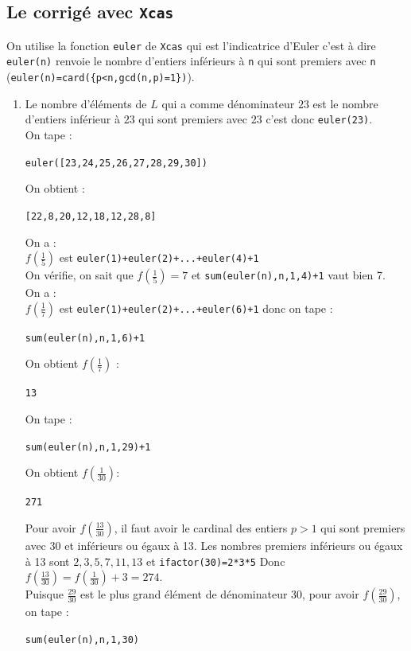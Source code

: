 \documentclass[a4paper,11pt]{book}
\begin{document}
\subsection{Le corrig\'e avec {\tt Xcas}}
On utilise la fonction {\tt euler} de {\tt Xcas} qui est l'indicatrice d'Euler 
c'est \`a dire {\tt euler(n)} renvoie le nombre d'entiers inf\'erieurs \`a 
{\tt n} qui sont premiers avec {\tt n} 
({\tt euler(n)=card(\{p<n,gcd(n,p)=1\})}).
\begin{enumerate}
\item Le nombre d'\'el\'ements de $L$ qui a comme d\'enominateur $23$ est  
le nombre d'entiers inf\'erieur \`a $23$ qui sont premiers avec $23$ c'est donc
{\tt euler(23)}.\\ 
On tape :
\begin{center}{\tt euler([23,24,25,26,27,28,29,30])}\end{center}
On obtient :
\begin{center}{\tt [22,8,20,12,18,12,28,8]}\end{center}
On a :\\
$f(\frac{1}{5})$ est {\tt euler(1)+euler(2)+...+euler(4)+1}\\
On v\'erifie, on sait que $f(\frac{1}{5})=7$ et 
{\tt sum(euler(n),n,1,4)+1} vaut bien 7.\\
On a :\\
$f(\frac{1}{7})$ est {\tt euler(1)+euler(2)+...+euler(6)+1} donc on tape :
\begin{center}{\tt sum(euler(n),n,1,6)+1}\end{center}
On obtient $f(\frac{1}{7})$ :
\begin{center}{\tt 13}\end{center}
On tape :
\begin{center}{\tt sum(euler(n),n,1,29)+1}\end{center}
On obtient $f(\frac{1}{30})$:
\begin{center}{\tt 271}\end{center}
Pour avoir $f(\frac{13}{30})$, il faut 
avoir le cardinal des entiers $p>1$ qui sont premiers avec 30 et inf\'erieurs 
ou \'egaux \`a 13. Les nombres premiers inf\'erieurs ou 
\'egaux \`a 13 sont $2,3,5,7,11,13$ et {\tt ifactor(30)=2*3*5}
Donc $f(\frac{13}{30})=f(\frac{1}{30})+3=274$.\\
Puisque $\frac{29}{30}$ est le plus grand \'el\'ement de d\'enominateur 30, 
pour avoir $f(\frac{29}{30})$, on tape :
\begin{center}{\tt sum(euler(n),n,1,30)}\end{center}

\end{enumerate}
\end{document}
